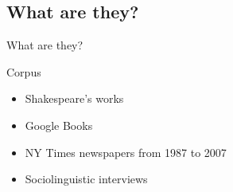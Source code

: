 \documentclass{beamer}
\newcommand{\subtwoone}{What are they?}
\begin{document}
    \subsection{\subtwoone}
      \begin{frame}{\subtwoone}
        \begin{alertblock}{Corpus}
          
        \end{alertblock}
        \begin{example}
          \begin{itemize}
            \item Shakespeare's works
            \item Google Books
            \item NY Times newspapers from 1987 to 2007
            \item Sociolinguistic interviews
          \end{itemize}
        \end{example}
      \end{frame}
\end{document}
